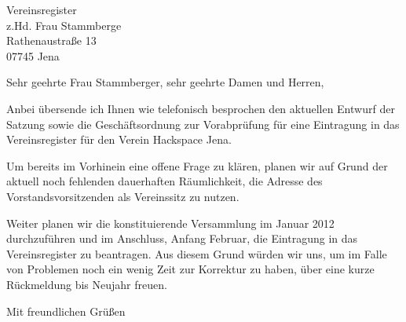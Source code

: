 \documentclass[fontsize=12pt,paper=a4,DIN]{scrlttr2}
\date{7. Dezember 2011}
\begin{document}
\begin{letter}{Vereinsregister \\ 
	z.Hd. Frau Stammberge \\ 
	Rathenaustraße 13 \\ 
	07745 Jena}


\opening{Sehr geehrte Frau Stammberger, sehr geehrte Damen und Herren,}

Anbei übersende ich Ihnen wie telefonisch besprochen den aktuellen 
Entwurf der Satzung sowie die Geschäftsordnung zur Vorabprüfung für 
eine Eintragung in das Vereinsregi\-ster für den Verein Hackspace 
Jena. 

Um bereits im Vorhinein eine offene Frage zu klären, planen wir auf 
Grund der aktuell noch fehlenden dauerhaften Räumlichkeit, die 
Adresse des Vorstandsvorsitzenden als Vereinssitz zu nutzen. 

Weiter planen wir die konstituierende Versammlung im Januar 2012 
durchzuführen und im Anschluss, Anfang Februar, die Eintragung in 
das Vereinsregister zu beantragen. Aus diesem Grund würden wir uns, 
um im Falle von Problemen noch ein wenig Zeit zur Korrektur zu haben,
über eine kurze Rückmeldung bis Neujahr freuen. 


\closing{Mit freundlichen Grüßen}

\end{letter}
\end{document}
